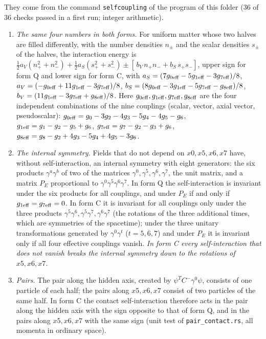 \documentclass[
  11pt,
]{article}
\providecommand{\tightlist}{%
  \setlength{\itemsep}{0pt}\setlength{\parskip}{0pt}}
\begin{document}
They come from the command \texttt{selfcoupling} of the program of this
folder (36 of 36 checks passed in a first run; integer arithmetic).

\begin{enumerate}
\def\labelenumi{\arabic{enumi}.}
\tightlist
\item
  \emph{The same four numbers in both forms.} For uniform matter whose
  two halves are filled differently, with the number densities \(n_\pm\)
  and the scalar densities \(s_\pm\) of the halves, the interaction
  energy is
  \(\tfrac12 a_V(n_+^2+n_-^2)+\tfrac12 a_S(s_+^2+s_-^2)\pm[\,b_V\,n_+n_-+b_S\,s_+s_-]\),
  upper sign for form Q and lower sign for form C, with
  \(a_S=(7g_{0\rm eff}-5g_{1\rm eff}-3g_{7\rm eff})/8\),
  \(a_V=(-g_{0\rm eff}+11g_{1\rm eff}-3g_{7\rm eff})/8\),
  \(b_S=(8g_{0\rm eff}-3g_{1\rm eff}-5g_{7\rm eff}-g_{8\rm eff})/8\),
  \(b_V=(11g_{1\rm eff}-3g_{7\rm eff}+g_{8\rm eff})/8\). Here
  \(g_{0\rm eff},g_{1\rm eff},g_{7\rm eff},g_{8\rm eff}\) are the four
  independent combinations of the nine couplings (scalar, vector, axial
  vector, pseudoscalar): \(g_{0\rm eff}=g_0-3g_2-4g_3-5g_4-4g_5-g_6\),
  \(g_{1\rm eff}=g_1-g_2-g_5+g_6\), \(g_{7\rm eff}=g_7-g_2-g_3+g_6\),
  \(g_{8\rm eff}=g_8-g_2+4g_3-5g_4+4g_5-3g_6\).
\item
  \emph{The internal symmetry.} Fields that do not depend on
  \(x0,x5,x6,x7\) have, without self-interaction, an internal symmetry
  with eight generators: the six products \(\gamma^a\gamma^b\) of two of
  the matrices \(\gamma^0,\gamma^5,\gamma^6,\gamma^7\), the unit matrix,
  and a matrix \(P_E\) proportional to
  \(\gamma^0\gamma^5\gamma^6\gamma^7\). In form Q the self-interaction
  is invariant under the six products for all couplings, and under
  \(P_E\) if and only if \(g_{1\rm eff}=g_{7\rm eff}=0\). In form C it
  is invariant for all couplings only under the three products
  \(\gamma^5\gamma^6,\gamma^5\gamma^7,\gamma^6\gamma^7\) (the rotations
  of the three additional times, which are symmetries of the spacetime);
  under the three unitary transformations generated by
  \(\gamma^0\gamma^t\) (\(t=5,6,7\)) and under \(P_E\) it is invariant
  only if all four effective couplings vanish. \emph{In form C every
  self-interaction that does not vanish breaks the internal symmetry
  down to the rotations of \(x5,x6,x7\).}
\item
  \emph{Pairs.} The pair along the hidden axis, created by
  \(\psi^TC^-\gamma^0\psi\), consists of one particle of each half; the
  pairs along \(x5,x6,x7\) consist of two particles of the same half. In
  form C the contact self-interaction therefore acts in the pair along
  the hidden axis with the sign opposite to that of form Q, and in the
  pairs along \(x5,x6,x7\) with the same sign (unit test of
  \texttt{pair\_contact.rs}, all momenta in ordinary space).
\end{enumerate}
\end{document}
